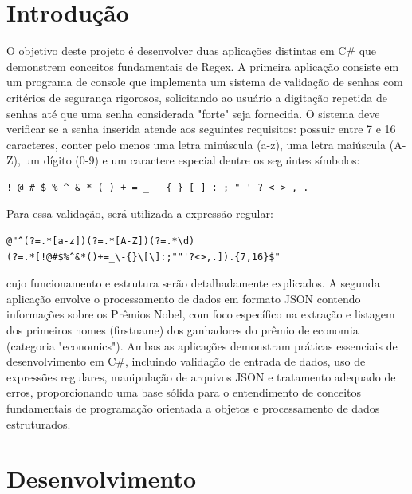\documentclass[
	12pt,				%
	oneside,			%
	a4paper,			%
	english,			%
	brazil,				%
	]{abntex2}
\begin{document}
\frenchspacing 

\imprimircapa

{
\ABNTEXchapterfont

\textual

\section{Introdução}

O objetivo deste projeto é desenvolver duas aplicações distintas em C\# que demonstrem conceitos fundamentais de Regex. A primeira aplicação consiste em um programa de console que implementa um sistema de validação de senhas com critérios de segurança rigorosos, solicitando ao usuário a digitação repetida de senhas até que uma senha considerada "forte" seja fornecida. O sistema deve verificar se a senha inserida atende aos seguintes requisitos: possuir entre 7 e 16 caracteres, conter pelo menos uma letra minúscula (a-z), uma letra maiúscula (A-Z), um dígito (0-9) e um caractere especial dentre os seguintes símbolos:

\begin{lstlisting}
! @ # $ % ^ & * ( ) + = _ - { } [ ] : ; " ' ? < > , .
\end{lstlisting}

Para essa validação, será utilizada a expressão regular:

\begin{lstlisting}
@"^(?=.*[a-z])(?=.*[A-Z])(?=.*\d)
(?=.*[!@#$%^&*()+=_\-{}\[\]:;""'?<>,.]).{7,16}$"
\end{lstlisting}

cujo funcionamento e estrutura serão detalhadamente explicados. A segunda aplicação envolve o processamento de dados em formato JSON contendo informações sobre os Prêmios Nobel, com foco específico na extração e listagem dos primeiros nomes (firstname) dos ganhadores do prêmio de economia (categoria "economics"). Ambas as aplicações demonstram práticas essenciais de desenvolvimento em C#, incluindo validação de entrada de dados, uso de expressões regulares, manipulação de arquivos JSON e tratamento adequado de erros, proporcionando uma base sólida para o entendimento de conceitos fundamentais de programação orientada a objetos e processamento de dados estruturados.

\section{Desenvolvimento}

}
\end{document}
